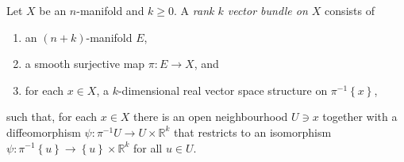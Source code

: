 \documentclass{article}
\begin{document}
\begin{definition}
  Let $X$ be an $n$-manifold and $k\geq 0$.
  A \emph{rank $k$ vector bundle on $X$} consists of
  \begin{enumerate}
    \item an $(n+k)$-manifold $E$,
    \item a smooth surjective map $\pi : E\to X$, and
    \item for each $x\in X$, a $k$-dimensional real vector space structure on ${\pi}^{-1}\left\lbrace{x}\right\rbrace$,
  \end{enumerate}
  such that, for each $x\in X$ there is an open neighbourhood $U\ni x$
  together with a diffeomorphism $\psi : {\pi}^{-1} U \to U\times\mathbb{R}^k$ that restricts to an isomorphism $\psi : {\pi}^{-1}\left\lbrace{u}\right\rbrace\to \left\lbrace{u}\right\rbrace\times\mathbb{R}^k$ for all $u\in U$.
\end{definition}
\end{document}

